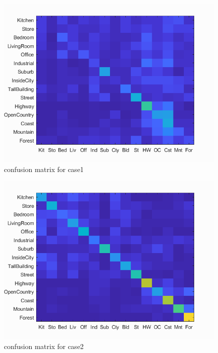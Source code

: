 \begin{figure}[h]
    \centering
    \includegraphics[width=13cm]{writeup/confusion_matrix1.png}
    \caption{confusion matrix for case1}
    \label{fig:result1}
\end{figure}
\begin{figure}[h]
    \centering
    \includegraphics[width=13cm]{writeup/confusion_matrix2.png}
    \caption{confusion matrix for case2}
    \label{fig:result2}
\end{figure}
